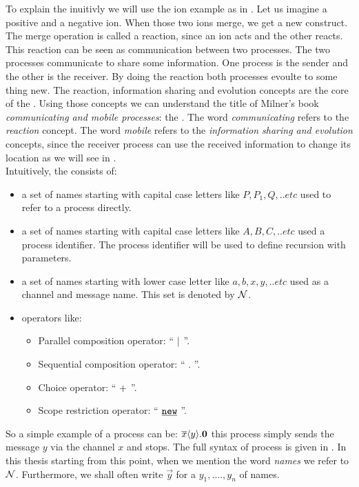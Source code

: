 To explain the \picalc{} inuitivly we will use the ion example as in \cite{milner}. Let us imagine a positive and a negative ion. When those two ions merge, we get a new construct. The merge operation is called a reaction, since an ion acts and the other reacts. This reaction can be seen as communication between two processes. The two processes communicate to share some information.  One process is the sender and the other is the receiver. By doing the reaction both processes evoulte to some thing new. The reaction, information sharing and evolution concepts are the core of the \picalc{}. Using those concepts we can understand the title of Milner's book \textit{communicating and mobile processes}: the \picalc{} \cite{milner}. The word \textit{communicating} refers to the \textit{reaction} concept. The word \textit{mobile} refers to the \textit{information sharing and evolution} concepts, since the receiver process can use the received information to change its location as we will see in .
\\Intuitively, the \picalc{} consists of: 
\begin{itemize}
\item a set of names starting with capital case letters  like $P, P_1, Q,..etc$  used to refer to a process directly.
\item a set of names starting with capital case letters  like $A, B, C,..etc$  used a process identifier. The process identifier will be used to define recursion with parameters.
\item a set of names starting with lower case letter like $a, b, x, y,..etc$  used as a channel and message name. This set is denoted by $\mathcal N$.
\item operators like:
	\begin{itemize}
	\item  Parallel composition operator: `` $\mid$ ''.
	\item  Sequential composition operator: `` $.$ ''.
	\item  Choice operator: `` $+$ ''.
	\item  Scope restriction operator: `` $\procres{}{}$ ''.
	\end{itemize}
\end{itemize}
So a simple example of a process can be: $\overline{x}\langle y\rangle.\mathbf{0}$ this process simply sends the message $y$ via the channel $x$ and stops.
The full syntax of \picalc{} process is given in . In this thesis starting from this point, when we mention the word \textit{names} we refer to $\mathcal N$. Furthermore, we shall often write $\vec{y}$ for a  $y_1,....,y_n$ of names.

